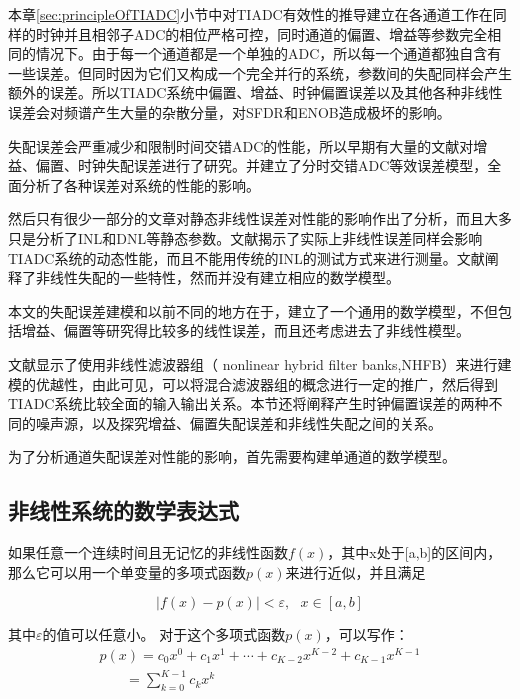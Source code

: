 	本章\ref{sec:principleOfTIADC}小节中对TIADC有效性的推导建立在各通道工作在同样的时钟并且相邻子ADC的相位严格可控，同时通道的偏置、增益等参数完全相同的情况下。由于每一个通道都是一个单独的ADC，所以每一个通道都独自含有一些误差。但同时因为它们又构成一个完全并行的系统，参数间的失配同样会产生额外的误差。所以TIADC系统中偏置、增益、时钟偏置误差以及其他各种非线性误差会对频谱产生大量的杂散分量，对SFDR和ENOB造成极坏的影响。\par
	失配误差会严重减少和限制时间交错ADC的性能，所以早期有大量的文献对增益、偏置、时钟失配误差进行了研究。并建立了分时交错ADC等效误差模型，全面分析了各种误差对系统的性能的影响。\par
	然后只有很少一部分的文章对静态非线性误差对性能的影响作出了分析，而且大多只是分析了INL和DNL等静态参数。文献\cite{simoes1997nonlinearity}揭示了实际上非线性误差同样会影响TIADC系统的动态性能，而且不能用传统的INL的测试方式来进行测量。文献\cite{kurosawa2002channel}阐释了非线性失配的一些特性，然而并没有建立相应的数学模型。\par
	本文的失配误差建模和以前不同的地方在于，建立了一个通用的数学模型，不但包括增益、偏置等研究得比较多的线性误差，而且还考虑进去了非线性模型。\par
	文献\cite{vogel2004analysis}显示了使用非线性滤波器组（ nonlinear hybrid filter banks,NHFB）来进行建模的优越性，由此可见，可以将混合滤波器组的概念进行一定的推广，然后得到TIADC系统比较全面的输入输出关系。本节还将阐释产生时钟偏置误差的两种不同的噪声源，以及探究增益、偏置失配误差和非线性失配之间的关系。\par	
	为了分析通道失配误差对性能的影响，首先需要构建单通道的数学模型。\par
	\subsection{非线性系统的数学表达式}\label{sec:nonlinearTheory}		
		
		如果任意一个连续时间且无记忆的非线性函数$f(x)$，其中x处于[a,b]的区间内，那么它可以用一个单变量的多项式函数$p(x)$来进行近似，并且满足

			\begin{equation}
				\left| {f\left( x \right) - p\left( x \right)} \right| < \varepsilon ,\,\,\,\,x \in \left[ {a,b} \right]
			\end{equation}
			
		其中$\varepsilon $的值可以任意小。
		对于这个多项式函数$p(x)$，可以写作：
			\begin{equation}
				\begin{array}{l}
	p\left( x \right) = {c_0}{x^0} + {c_1}{x^1} +  \cdots  + {c_{K - 2}}{x^{K - 2}} + {c_{K - 1}}{x^{K - 1}}\\
	\,\,\,\,\,\,\,\,\,\,\, = \sum\limits_{k = 0}^{K - 1} {{c_k}{x^k}} 
	\end{array} \label{eq:theorem}
			\end{equation}
			
